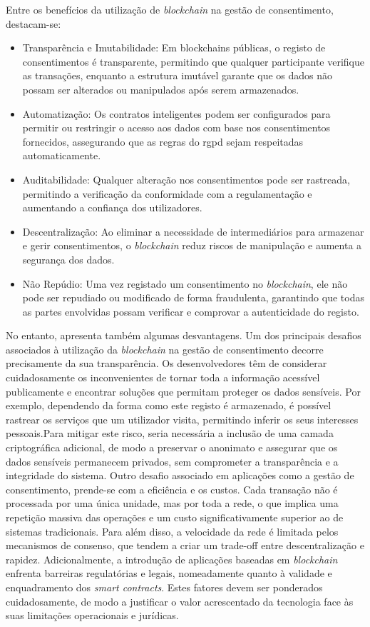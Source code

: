Entre os benefícios da utilização de \textit{blockchain} na gestão de consentimento, destacam-se:

\begin{itemize}
    \item Transparência e Imutabilidade: Em blockchains públicas, o registo de consentimentos é transparente, permitindo que qualquer participante verifique as transações, enquanto a estrutura imutável garante que os dados não possam ser alterados ou manipulados após serem armazenados.
    \item Automatização: Os contratos inteligentes podem ser configurados para permitir ou restringir o acesso aos dados com base nos consentimentos fornecidos, assegurando que as regras do \acrshort{rgpd} sejam respeitadas automaticamente.
    \item Auditabilidade: Qualquer alteração nos consentimentos pode ser rastreada, permitindo a verificação da conformidade com a regulamentação e aumentando a confiança dos utilizadores.
    \item Descentralização: Ao eliminar a necessidade de intermediários para armazenar e gerir consentimentos, o \textit{blockchain} reduz riscos de manipulação e aumenta a segurança dos dados.
    \item Não Repúdio: Uma vez registado um consentimento no \textit{blockchain}, ele não pode ser repudiado ou modificado de forma fraudulenta, garantindo que todas as partes envolvidas possam verificar e comprovar a autenticidade do registo.
\end{itemize}

No entanto, apresenta também algumas desvantagens. Um dos principais desafios associados à utilização da \textit{blockchain} na gestão de consentimento decorre precisamente da sua transparência. Os desenvolvedores têm de considerar cuidadosamente os inconvenientes de tornar toda a informação acessível publicamente e encontrar soluções que permitam proteger os dados sensíveis. Por exemplo, dependendo da forma como este registo é armazenado, é possível rastrear os serviços que um utilizador visita, permitindo inferir os seus interesses pessoais.Para mitigar este risco, seria necessária a inclusão de uma camada criptográfica adicional, de modo a preservar o anonimato e assegurar que os dados sensíveis permanecem privados, sem comprometer a transparência e a integridade do sistema.
Outro desafio associado em aplicações como a gestão de consentimento, prende-se com a eficiência e os custos. Cada transação não é processada por uma única unidade, mas por toda a rede, o que implica uma repetição massiva das operações e um custo significativamente superior ao de sistemas tradicionais. Para além disso, a velocidade da rede é limitada pelos mecanismos de consenso, que tendem a criar um trade-off entre descentralização e rapidez. Adicionalmente, a introdução de aplicações baseadas em \textit{blockchain} enfrenta barreiras regulatórias e legais, nomeadamente quanto à validade e enquadramento dos \textit{smart contracts}. Estes fatores devem ser ponderados cuidadosamente, de modo a justificar o valor acrescentado da tecnologia face às suas limitações operacionais e jurídicas.

